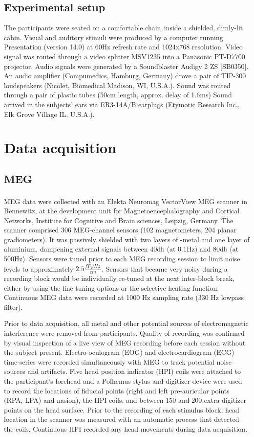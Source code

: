 \subsection{Experimental setup}
The participants were seated on a comfortable chair, inside a shielded, dimly-lit cabin.
Visual and auditory stimuli were produced by a computer running Presentation (version 14.0) at 60Hz refresh rate and 1024x768 resolution.
Video signal was routed through a video splitter MSV1235 into a Panasonic PT-D7700 projector.
Audio signals were generated by a Soundblaster Audigy 2 ZS [SB0350].
An audio amplifier (Compumedics, Hamburg, Germany) drove a pair of TIP-300 loudspeakers (Nicolet, Biomedical Madison, WI, U.S.A.).
Sound was routed through a pair of plastic tubes (50cm length, approx. delay of 1.6ms)
Sound arrived in the subjects' ears via ER3-14A/B earplugs (Etymotic Research Inc., Elk Grove Village IL, U.S.A.).

\section{Data acquisition}

\subsection {MEG}
MEG data were collected with an Elekta Neuromag VectorView\textsuperscript{\textregistered} MEG scanner in Bennewitz, at the development unit for Magnetoencephalography and Cortical Networks, Institute for Cognitive and Brain sciences, Leipzig, Germany.
The scanner comprised 306 MEG-channel sensors (102 magnetometers, 204 planar gradiometers).
It was passively shielded with two layers of \si{\micro}-metal and one layer of aluminium, dampening external signals between 40db (at 0.1Hz) and 80db (at 500Hz).
Sensors were tuned prior to each MEG recording session to limit noise levels to approximately $2.5 \frac{fT\sqrt{Hz}}{cm}$.
Sensors that became very noisy during a recording block would be individually re-tuned at the next inter-block break, either by using the fine-tuning options or the selective heating function.
Continuous MEG data were recorded at 1000 Hz sampling rate (330 Hz lowpass filter).

Prior to data acquisition, all metal and other potential sources of electromagnetic interference were removed from participants.
Quality of recording was confirmed by visual inspection of a live view of MEG recording before each session without the subject present.
Electro-oculogram (EOG) and electrocardiogram (ECG) time-series were recorded simultaneously with MEG to track potential noise sources and artifacts.
Five head position indicator (HPI) coils were attached to the participant's forehead and a Polhemus stylus and digitizer device were used to record the locations of fiducial points (right and left pre-auricular points (RPA, LPA) and nasion), the HPI coils, and between 150 and 200 extra digitizer points on the head surface.
Prior to the recording of each stimulus block, head location in the scanner was measured with an automatic process that detected the coils.
Continuous HPI recorded any head movements during data acquisition.

